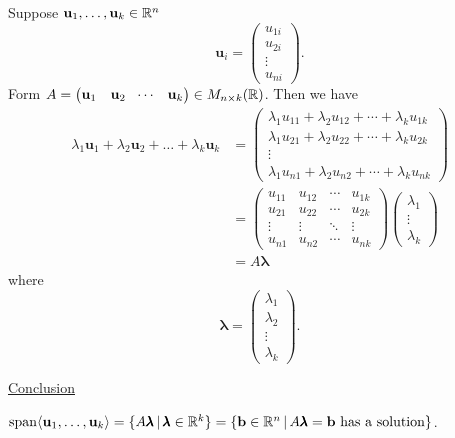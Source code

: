 \documentclass[10pt, a4paper]{article}
\newcommand{\mbf}[1]{\mathbf{#1}}
\begin{document}
Suppose $\mbf{u}_1, \dotsc, \mbf{u}_k \in \R ^ n$
\[
\mbf{u}_i = \begin{pmatrix}
    u_{1i} \\ u_{2i} \\ \vdots \\ u_{ni}
\end{pmatrix}.
\]
Form $A = \begin{pmatrix}
    \mbf{u}_1  & \mbf{u}_2 & \dotsi & \mbf{u}_k
\end{pmatrix} \in M_{n \times k}(\R)$.
Then we have
\begin{align*}
\lambda_1\mbf{u}_1 + \lambda_2\mbf{u}_2 + \dotsc + \lambda_k\mbf{u}_k
&= \begin{pmatrix}
    \lambda_1u_{11} + \lambda_2u_{12} + \dotsi + \lambda_ku_{1k} \\
    \lambda_1u_{21} + \lambda_2u_{22} + \dotsi + \lambda_ku_{2k} \\
    \vdots \\
    \lambda_1u_{n1} + \lambda_2u_{n2} + \dotsi + \lambda_ku_{nk}
\end{pmatrix} \\
&= \begin{pmatrix}
    u_{11} & u_{12} & \dotsi & u_{1k} \\
    u_{21} & u_{22} & \dotsi & u_{2k} \\
    \vdots & \vdots & \ddots & \vdots \\
    u_{n1} & u_{n2} & \dotsi & u_{nk}
\end{pmatrix}
\begin{pmatrix}
    \lambda_1 \\ \vdots \\ \lambda_k
\end{pmatrix} \\
&=
A\pmb{\lambda}
\end{align*}
where
\[
\pmb{\lambda} = \begin{pmatrix}
    \lambda_1 \\ \lambda_2 \\ \vdots \\ \lambda_k
\end{pmatrix}.
\]

\underline{Conclusion}

$\mathrm{span}\langle\mbf{u}_1, \dotsc, \mbf{u}_k\rangle = \{A\pmb{\lambda}\,|\,\pmb{\lambda} \in \R ^ k\} = \{\mbf{b} \in \R ^ n\,|\, A\pmb{\lambda} = \mbf{b}\text{ has a solution}\}$.
\end{document}
